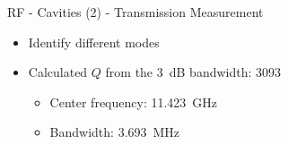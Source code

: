 \documentclass{beamer}
\begin{document}
\begin{frame}[t,fragile]{RF - Cavities (2) - Transmission Measurement}
\begin{itemize}
\item Identify different modes 
\item Calculated $Q$ from the \SI{3}{\dB} bandwidth: \num{3093}
\begin{itemize}
\item Center frequency: \SI{11.423}{\GHz}
\item Bandwidth: \SI{3.693}{\MHz}
\end{itemize}
\begin{figure}
  \centering\setcounter{subfigure}{0}
  \quad
  \\
\end{figure}
\end{itemize}
\end{frame}
\end{document}
